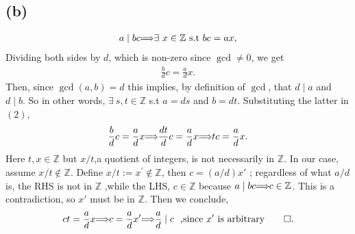 \documentclass[12pt]{article}
\let\oldimplies\implies
\renewcommand*{\implies}{
	\hspace{-0.05cm}\resizebox{.95\width}{\height}{$\oldimplies$}\hspace{-0.05cm}
}
\begin{document}
		\subsection*{(b)}
		\begin{align*} 
		a \mid bc \implies \exists \ x \in \mathbb{Z} \ \text{s.t} \ bc = ax,
		\end{align*}
		 Dividing both sides by $d$, which is non-zero since $\gcd \neq 0$, we get 
		\begin{align*} 
		\frac{b}{d}c = \frac{a}{d}x \tag{2}. 
		\end{align*}
		Then, since $\gcd(a,b) = d$ this implies, by definition of $\gcd$, that $d \mid a$ and $d \mid b$. So in other words, $\exists \ s,t \in \mathbb{Z} $ s.t $a = ds$ and $b =dt$. Substituting the latter in $(2)$, 
		$$ \frac{b}{d}c = \frac{a}{d}x \implies \frac{dt}{d}c = \frac{a}{d}x \implies tc = \frac{a}{d}x.$$
		Here $t,x \in \mathbb{Z}$ but $x/t$,a quotient of integers, is not necessarily in $\mathbb{Z}$. In our case, assume $x/t \not\in \mathbb{Z}$. Define $x/t := x^{\prime} \not\in \mathbb{Z}$, then $c = (a/d)x'$ ; regardless of what $a/d$ is, the RHS is not in $\mathbb{Z}$ ,while the LHS, $c \in \mathbb{Z}$ because $a \mid bc \implies c \in \mathbb{Z}$. This is a contradiction, so $x'$ must be in $\mathbb{Z}$.  Then we conclude, 
		$$ ct = \frac{a}{d}x \implies c = \frac{a}{d} x^{\prime} \implies \frac{a}{d} \mid c \ \text{  ,since } x' \ \text{is arbitrary} \qquad \square.$$
		
			
\end{document}
